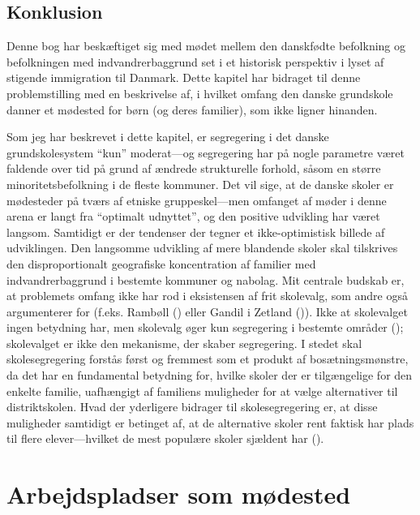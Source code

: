 \documentclass[
]{book}
\begin{document}
\section{Konklusion}\label{konklusion}

Denne bog har beskæftiget sig med mødet mellem den danskfødte befolkning og befolkningen med indvandrerbaggrund set i et historisk perspektiv i lyset af stigende immigration til Danmark. Dette kapitel har bidraget til denne problemstilling med en beskrivelse af, i hvilket omfang den danske grundskole danner et mødested for børn (og deres familier), som ikke ligner hinanden.

Som jeg har beskrevet i dette kapitel, er segregering i det danske grundskolesystem ``kun'' moderat---og segregering har på nogle parametre været faldende over tid på grund af ændrede strukturelle forhold, såsom en større minoritetsbefolkning i de fleste kommuner. Det vil sige, at de danske skoler er mødesteder på tværs af etniske gruppeskel---men omfanget af møder i denne arena er langt fra ``optimalt udnyttet'', og den positive udvikling har været langsom. Samtidigt er der tendenser der tegner et ikke-optimistisk billede af udviklingen. Den langsomme udvikling af mere blandende skoler skal tilskrives den disproportionalt geografiske koncentration af familier med indvandrerbaggrund i bestemte kommuner og nabolag. Mit centrale budskab er, at problemets omfang ikke har rod i eksistensen af frit skolevalg, som andre også argumenterer for (f.eks. Rambøll () eller Gandil i Zetland ()). Ikke at skolevalget ingen betydning har, men skolevalg øger kun segregering i bestemte områder (); skolevalget er ikke den mekanisme, der skaber segregering. I stedet skal skolesegregering forstås først og fremmest som et produkt af bosætningsmønstre, da det har en fundamental betydning for, hvilke skoler der er tilgængelige for den enkelte familie, uafhængigt af familiens muligheder for at vælge alternativer til distriktskolen. Hvad der yderligere bidrager til skolesegregering er, at disse muligheder samtidigt er betinget af, at de alternative skoler rent faktisk har plads til flere elever---hvilket de mest populære skoler sjældent har ().

\chapter{Arbejdspladser som mødested}\label{kap4}
\end{document}
